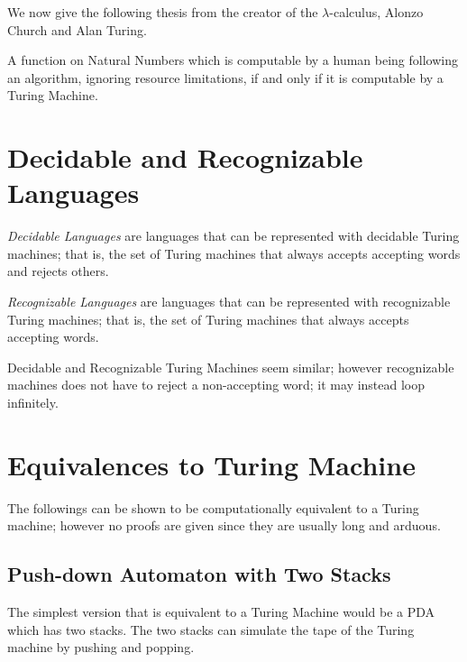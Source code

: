 \documentclass{report}
\begin{document}
		We now give the following thesis from the creator of the $\lambda$-calculus, Alonzo Church and Alan Turing.
		\begin{thesis} \label{thm_church_turing}
			A function on Natural Numbers which is computable by a human being following an algorithm, ignoring resource limitations, if and only if it is computable by a Turing Machine.
		\end{thesis}
		
		\section{Decidable and Recognizable Languages}
		\begin{defn} \label{def_decidable_language}
			\emph{Decidable Languages} are languages that can be represented with decidable Turing machines; that is, the set of Turing machines that always accepts accepting words and rejects others.
		\end{defn}
	
		\begin{defn} \label{def_recognizable_language}
			\emph{Recognizable Languages} are languages that can be represented with recognizable Turing machines; that is, the set of Turing machines that always accepts accepting words.
		\end{defn}
		
		Decidable and Recognizable Turing Machines seem similar; however recognizable machines does not have to reject a non-accepting word; it may instead loop infinitely.
		
		\section{Equivalences to Turing Machine}
			The followings can be shown to be computationally equivalent to a Turing machine; however no proofs are given since they are usually long and arduous.

			\subsection{Push-down Automaton with Two Stacks}
			The simplest version that is equivalent to a Turing Machine would be a PDA which has two stacks. The two stacks can simulate the tape of the Turing machine by pushing and popping.
			
\end{document}
